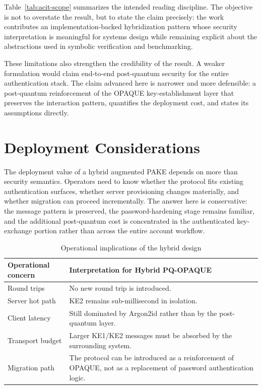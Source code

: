 \documentclass[conference]{IEEEtran}
\begin{document}
Table~\ref{tab:acit-scope} summarizes the intended reading discipline. The objective is not to overstate the result, but to state the claim precisely: the work contributes an implementation-backed hybridization pattern whose security interpretation is meaningful for systems design while remaining explicit about the abstractions used in symbolic verification and benchmarking.

These limitations also strengthen the credibility of the result. A weaker formulation would claim end-to-end post-quantum security for the entire authentication stack. The claim advanced here is narrower and more defensible: a post-quantum reinforcement of the OPAQUE key-establishment layer that preserves the interaction pattern, quantifies the deployment cost, and states its assumptions directly.

\section{Deployment Considerations}

The deployment value of a hybrid augmented PAKE depends on more than security semantics. Operators need to know whether the protocol fits existing authentication surfaces, whether server provisioning changes materially, and whether migration can proceed incrementally. The answer here is conservative: the message pattern is preserved, the password-hardening stage remains familiar, and the additional post-quantum cost is concentrated in the authenticated key-exchange portion rather than across the entire account workflow.

\begin{table}[t]
\caption{Operational implications of the hybrid design}
\label{tab:acit-deployment}
\centering
\footnotesize
\begin{tabularx}{\columnwidth}{@{}L{2.1cm}Y@{}}
\toprule
Operational concern & Interpretation for Hybrid PQ-OPAQUE \\
\midrule
Round trips & No new round trip is introduced. \\
Server hot path & KE2 remains sub-millisecond in isolation. \\
Client latency & Still dominated by Argon2id rather than by the post-quantum layer. \\
Transport budget & Larger KE1/KE2 messages must be absorbed by the surrounding system. \\
Migration path & The protocol can be introduced as a reinforcement of OPAQUE, not as a replacement of password authentication logic. \\
\bottomrule
\end{tabularx}
\end{table}
\end{document}
